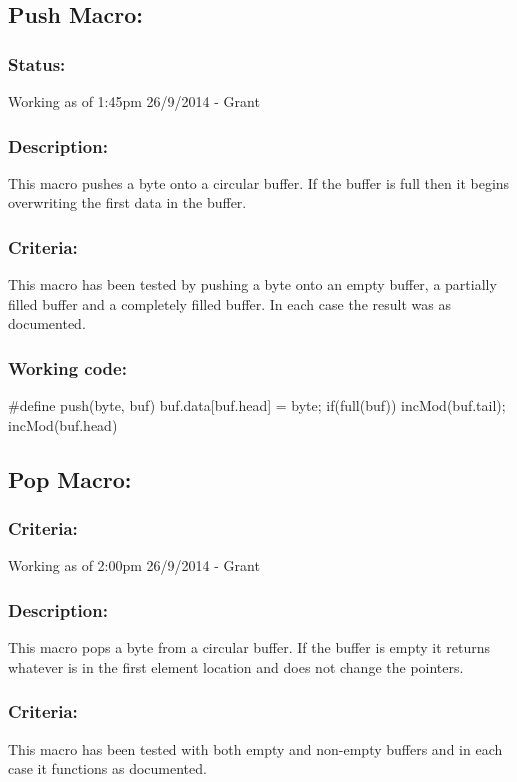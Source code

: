 \documentclass[]{article}
\begin{document}
\subsection{Push Macro:}
\subsubsection{Status:}
Working as of 1:45pm 26/9/2014 - Grant

\subsubsection{Description:}
This macro pushes a byte onto a circular buffer. If the buffer is full then it begins overwriting the first data in the buffer.

\subsubsection{Criteria:}
This macro has been tested by pushing a byte onto an empty buffer, a partially filled buffer and a completely filled buffer. In each case the result was as documented.

\subsubsection{Working code:}
\#define push(byte, buf) buf.data[buf.head] = byte; if(full(buf)) incMod(buf.tail); incMod(buf.head)

\subsection{Pop Macro:}
\subsubsection{Criteria:}
Working as of 2:00pm 26/9/2014 - Grant

\subsubsection{Description:}
This macro pops a byte from a circular buffer. If the buffer is empty it returns whatever is in the first element location and does not change the pointers.

\subsubsection{Criteria:}
This macro has been tested with both empty and non-empty buffers and in each case it functions as documented.
\end{document}
